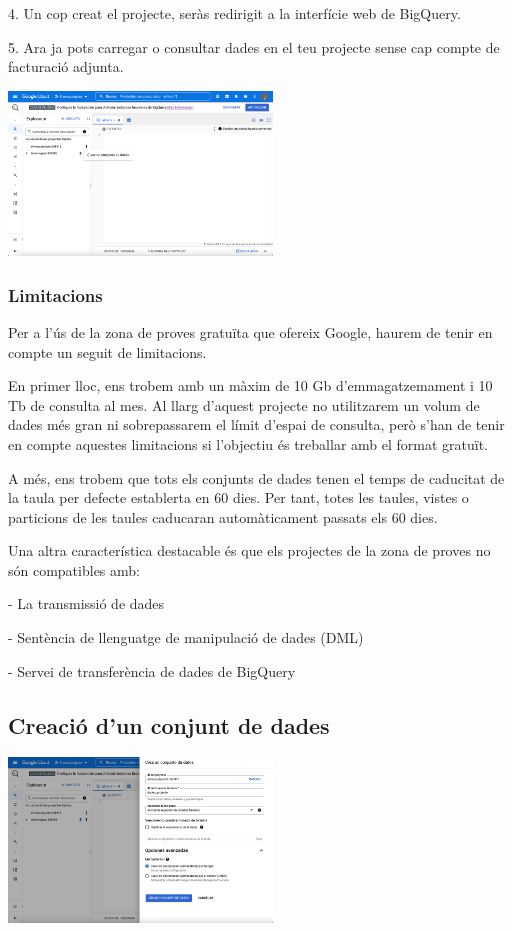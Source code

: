 \documentclass[12pt,longbibliography]{article}
\theoremstyle{definition}
\theoremstyle{remark}
\begin{document}
4. Un cop creat el projecte, seràs redirigit a la interfície web de BigQuery.

5. Ara ja pots carregar o consultar dades en el teu projecte sense cap compte de
facturació adjunta.

\begin{center}
\includegraphics[width=7cm]{bq3}
\end{center}

\subsubsection{Limitacions}

Per a l’ús de la zona de proves gratuïta que ofereix Google, haurem de tenir en compte un seguit de limitacions.

En primer lloc, ens trobem amb un màxim de 10 Gb d’emmagatzemament i 10 Tb de consulta al mes. Al llarg d’aquest projecte no utilitzarem un volum de dades més gran ni sobrepassarem el límit d’espai de consulta, però s’han de tenir en compte aquestes limitacions si l’objectiu és treballar amb el format gratuït.

A més, ens trobem que tots els conjunts de dades tenen el temps de caducitat de la taula per defecte establerta en 60 dies. Per tant, totes les taules, vistes o particions de les taules caducaran automàticament passats els 60 dies.

Una altra característica destacable és que els projectes de la zona de proves no són compatibles amb:

- La transmissió de dades

- Sentència de llenguatge de manipulació de dades (DML)

- Servei de transferència de dades de BigQuery

\subsection{Creació d'un conjunt de dades}

\begin{center}
\includegraphics[width=7cm]{bq4}
\end{center}
\end{document}
